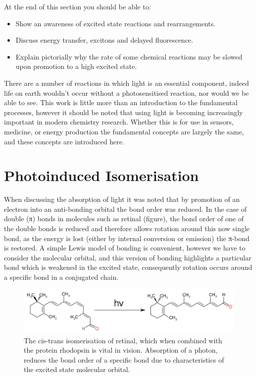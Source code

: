 \documentclass[
]{book}
\providecommand{\tightlist}{%
  \setlength{\itemsep}{0pt}\setlength{\parskip}{0pt}}
\begin{document}
At the end of this section you should be able to:

\begin{itemize}
\tightlist
\item
  Show an awareness of excited state reactions and rearrangements.
\item
  Discuss energy transfer, excitons and delayed fluorescence.
\item
  Explain pictorially why the rate of some chemical reactions may be slowed upon promotion to a high excited state.
\end{itemize}

There are a number of reactions in which light is an essential component, indeed life on earth wouldn't occur without a photosensitised reaction, nor would we be able to see. This work is little more than an introduction to the fundamental processes, however it should be noted that using light is becoming increasingly important in modern chemistry research. Whether this is for use in sensors, medicine, or energy production the fundamental concepts are largely the same, and these concepts are introduced here.

\hypertarget{sec:photoinducedisom}{%
\section{Photoinduced Isomerisation}\label{sec:photoinducedisom}}

When discussing the absorption of light it was noted that by promotion of an electron into an anti-bonding orbital the bond order was reduced. In the case of double (π) bonds in molecules such as retinal (figure), the bond order of one of the double bonds is reduced and therefore allows rotation around this now single bond, as the energy is lost (either by internal conversion or emission) the π-bond is restored. A simple Lewis model of bonding is convenient, however we have to consider the molecular orbital, and this version of bonding highlights a particular bond which is weakened in the excited state, consequently rotation occurs around a specific bond in a conjugated chain.

\begin{figure}

{\centering \includegraphics[width=0.7\linewidth]{images/retinal} 

}

\caption{The cis-trans isomerisation of retinal, which when combined with the protein rhodopsin is vital in vision. Absorption of a photon, reduces the bond order of a specific bond due to characteristics of the excited state molecular orbital.}\label{fig:retinal}
\end{figure}
\end{document}
